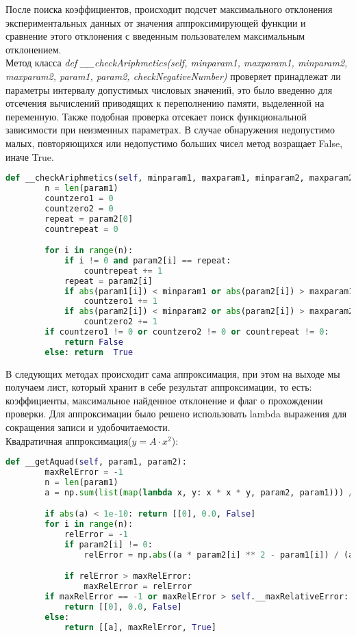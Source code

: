     После поиска коэффициентов, происходит подсчет максимального отклонения экспериментальных данных от значения аппроксимирующей функции и сравнение этого отклонения с введенным пользователем максимальным отклонением.\\

    Метод класса \textit{def \_\_checkAriphmetics(self, minparam1, maxparam1, minparam2, maxparam2, param1, param2, checkNegativeNumber)} проверяет принадлежат ли параметры интервалу допустимых числовых значений, это было введенно для отсечения вычислений приводящих к переполнению памяти, выделенной на переменную. Также подобная проверка отсекает поиск функциональной зависимости при неизменных параметрах. В случае обнаружения недопустимо малых, повторяющихся или недопустимо больших чисел метод возращает False, иначе True. 

    \begin{lstlisting}[language=Python]
    def __checkAriphmetics(self, minparam1, maxparam1, minparam2, maxparam2, param1, param2, checkNegativeNumber):
        n = len(param1)
        countzero1 = 0
        countzero2 = 0
        repeat = param2[0]
        countrepeat = 0

        for i in range(n):
            if i != 0 and param2[i] == repeat:
                countrepeat += 1
            repeat = param2[i]
            if abs(param1[i]) < minparam1 or abs(param2[i]) > maxparam1 or (checkNegativeNumber and param1[i] < 0.0):
                countzero1 += 1
            if abs(param2[i]) < minparam2 or abs(param2[i]) > maxparam2:
                countzero2 += 1
        if countzero1 != 0 or countzero2 != 0 or countrepeat != 0:
            return False
        else: return  True
    \end{lstlisting}

    В следующих методах происходит сама аппроксимация, при этом на выходе мы получаем лист, который хранит в себе результат аппроксимации, то есть: коэффициенты, максимальное найденное отклонение и флаг о прохождении проверки. Для аппроксимации было решено использовать lambda выражения для сокращения записи и удобочитаемости.\\
    
    Квадратичная аппроксимация($y=A\cdot x^2$):
    \begin{lstlisting}[language=Python]
    def __getAquad(self, param1, param2):
        maxRelError = -1
        n = len(param1)
        a = np.sum(list(map(lambda x, y: x * x * y, param2, param1))) / np.sum(list(map(lambda x: x ** 4, param2)))

        if abs(a) < 1e-10: return [[0], 0.0, False]
        for i in range(n):
            relError = -1
            if param2[i] != 0:
                relError = np.abs((a * param2[i] ** 2 - param1[i]) / (a * param2[i] ** 2))

            if relError > maxRelError:
                maxRelError = relError
        if maxRelError == -1 or maxRelError > self.__maxRelativeError:
            return [[0], 0.0, False]
        else:
            return [[a], maxRelError, True]
    \end{lstlisting}

